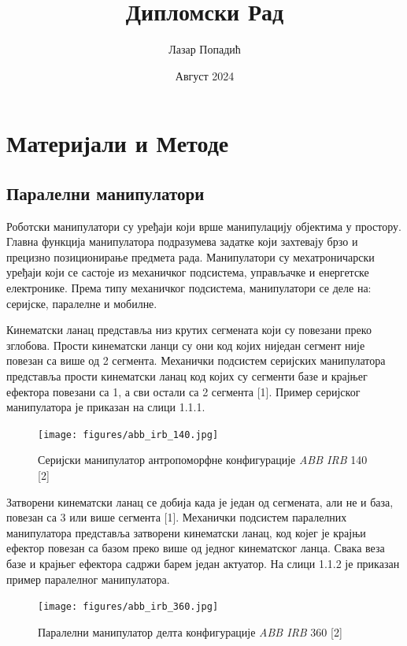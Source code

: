 \documentclass[12pt]{article}
\title{Дипломски Рад}
\author{Лазар Попадић}
\date{Август 2024}
\begin{document}
\tableofcontents
\newpage

\section{Материјали и Методе}

\subsection{Паралелни манипулатори}
Роботски манипулатори су уређаји који врше манипулацију објектима у простору. Главна функција манипулатора подразумева задатке који захтевају брзо и прецизно позиционирање предмета рада. Манипулатори су мехатроничарски уређаји који се састоје из механичког подсистема, управљачке и енергетске електронике. Према типу механичког подсистема, манипулатори се деле на: серијске, паралелне и мобилне.

Кинематски ланац представља низ крутих сегмената који су повезани преко зглобова. Прости кинематски ланци су они код којих ниједан сегмент није повезан са више од 2 сегмента. Механички подсистем серијских манипулатора представља прости кинематски ланац код којих су сегменти базе и крајњег ефектора повезани са 1, а сви остали са 2 сегмента [1]. Пример серијског манипулатора је приказан на слици 1.1.1.

\begin{figure}[H]
    \centering
    \texttt{[image: figures/abb\_irb\_140.jpg]}
    \caption{Серијски манипулатор антропоморфне конфигурације \textit{ABB IRB} 140 [2]}
    \label{fig:серијски_манипулатор}
\end{figure}

Затворени кинематски ланац се добија када је један од сегмената, али не и база, повезан са 3 или више сегмента [1]. Механички подсистем паралелних манипулатора представља затворени кинематски ланац, код којег је крајњи ефектор повезан са базом преко више од једног кинематског ланца. Свака веза базе и крајњег ефектора садржи барем један актуатор. На слици 1.1.2 је приказан пример паралелног манипулатора.

\begin{figure}[H]
    \centering
    \texttt{[image: figures/abb\_irb\_360.jpg]}
    \caption{Паралелни манипулатор делта конфигурације \textit{ABB IRB} 360 [2]}
    \label{fig:паралелни_манипулатор}
\end{figure}
\end{document}
